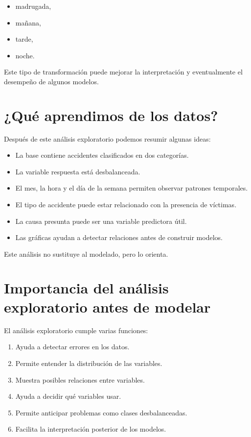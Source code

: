 \documentclass[
  11pt,
  letterpaper,
]{book}
\providecommand{\tightlist}{%
  \setlength{\itemsep}{0pt}\setlength{\parskip}{0pt}}
\begin{document}
\begin{itemize}
\tightlist
\item
  madrugada,
\item
  mañana,
\item
  tarde,
\item
  noche.
\end{itemize}

Este tipo de transformación puede mejorar la interpretación y
eventualmente el desempeño de algunos modelos.

\section{¿Qué aprendimos de los
datos?}\label{quuxe9-aprendimos-de-los-datos}

Después de este análisis exploratorio podemos resumir algunas ideas:

\begin{itemize}
\tightlist
\item
  La base contiene accidentes clasificados en dos categorías.
\item
  La variable respuesta está desbalanceada.
\item
  El mes, la hora y el día de la semana permiten observar patrones
  temporales.
\item
  El tipo de accidente puede estar relacionado con la presencia de
  víctimas.
\item
  La causa presunta puede ser una variable predictora útil.
\item
  Las gráficas ayudan a detectar relaciones antes de construir modelos.
\end{itemize}

Este análisis no sustituye al modelado, pero lo orienta.

\section{Importancia del análisis exploratorio antes de
modelar}\label{importancia-del-anuxe1lisis-exploratorio-antes-de-modelar}

El análisis exploratorio cumple varias funciones:

\begin{enumerate}
\def\labelenumi{\arabic{enumi}.}
\tightlist
\item
  Ayuda a detectar errores en los datos.
\item
  Permite entender la distribución de las variables.
\item
  Muestra posibles relaciones entre variables.
\item
  Ayuda a decidir qué variables usar.
\item
  Permite anticipar problemas como clases desbalanceadas.
\item
  Facilita la interpretación posterior de los modelos.
\end{enumerate}
\end{document}
